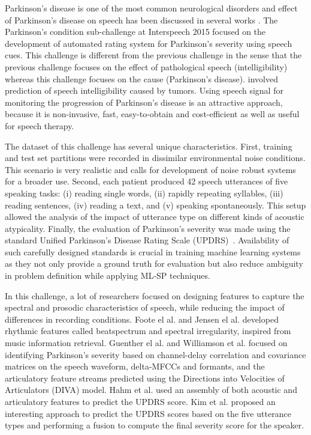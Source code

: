 \documentclass{article}
\begin{document}
Parkinson's disease is one of the most common neurological disorders and effect of Parkinson's disease on speech has been discussed in several works \cite{lieberman1992speech,kempler2002effect}.
The Parkinson's condition sub-challenge at Interspeech 2015 focused on the development of automated rating system for Parkinson's severity using speech cues.
This challenge is different from the previous challenge in the sense that the previous challenge focuses on the effect of pathological speech (intelligibility) whereas this challenge focuses on the cause (Parkinson's disease). 
involved prediction of speech intelligibility caused by tumors.
Using speech signal for monitoring the progression of Parkinson's disease is an attractive approach, because it is non-invasive, fast, easy-to-obtain and cost-efficient as well as useful for speech therapy.

The dataset of this challenge has several unique characteristics. 
First, training and test set partitions were recorded in dissimilar environmental noise conditions.
This scenario is very realistic and calls for development of noise robust systems for a broader use. 
Second, each patient produced 42 speech utterances of five speaking tasks: (i) reading single words, (ii) rapidly repeating syllables, (iii) reading sentences, (iv) reading a text, and (v) speaking spontaneously.
This setup allowed the analysis of the impact of utterance type on different kinds of acoustic atypicality.
Finally, the evaluation of Parkinson's severity was made using the standard Unified Parkinson's Disease Rating Scale (UPDRS)~\cite{stebbins1998factor}.
Availability of such carefully designed standards is crucial in training machine learning systems as they not only provide a ground truth for evaluation but also reduce ambiguity in problem definition while applying ML-SP techniques.

In this challenge, a lot of researchers focused on designing features to capture the spectral and prosodic characteristics of speech, while reducing the impact of differences in recording conditions.
Foote el al. \cite{foote2002audio} and Jensen el al. \cite{jensen1999timbre} developed rhythmic features called beatspectrum and spectral irregularity, inspired from music information retrieval.
Guenther el al. \cite{guenther2006neural} and Williamson et al. \cite{williamson2015segment} focused on identifying Parkinson's severity based on channel-delay correlation and covariance matrices on the speech waveform, delta-MFCCs and formants, and the articulatory feature streams predicted using the Directions into Velocities of Articulators (DIVA) model.
Hahm et al. \cite{hahm2015parkinson} used an assembly of both acoustic and articulatory features to predict the UPDRS score.
Kim et al. \cite{kim2015automatic} proposed an interesting approach to predict the UPDRS scores based on the five utterance types and performing a fusion to compute the final severity score for the speaker.
\end{document}
